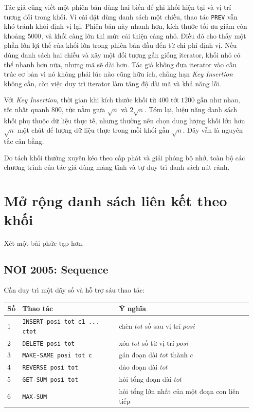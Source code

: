 \documentclass[11pt]{article}
\begin{document}
Tác giả cũng viết một phiên bản dùng hai biến để ghi khối hiện tại và vị trí
tương đối trong khối. Vì cài đặt dùng danh sách một chiều, thao tác
\texttt{PREV} vẫn khó tránh khỏi định vị lại. Phiên bản này nhanh hơn, kích
thước tối ưu giảm còn khoảng \(5000\), và khối càng lớn thì mức cải thiện càng
nhỏ. Điều đó cho thấy một phần lớn lợi thế của khối lớn trong phiên bản đầu
đến từ chi phí định vị. Nếu dùng danh sách hai chiều và xây một đối tượng gần
giống iterator, khối nhỏ có thể nhanh hơn nữa, nhưng mã sẽ dài hơn. Tác giả
không đưa iterator vào cấu trúc cơ bản vì nó không phải lúc nào cũng hữu ích,
chẳng hạn \textit{Key Insertion} không cần, còn việc duy trì iterator làm tăng
độ dài mã và khả năng lỗi.

Với \textit{Key Insertion}, thời gian khi kích thước khối từ \(400\) tới
\(1200\) gần như nhau, tốt nhất quanh \(800\), tức nằm giữa \(\sqrt n\) và
\(2\sqrt n\). Tóm lại, hiệu năng danh sách khối phụ thuộc dữ liệu thực tế,
nhưng thường nên chọn dung lượng khối lớn hơn \(\sqrt n\) một chút để lượng
dữ liệu thực trong mỗi khối gần \(\sqrt n\). Đây vẫn là nguyên tắc cân bằng.

Do tách khối thường xuyên kéo theo cấp phát và giải phóng bộ nhớ, toàn bộ các
chương trình của tác giả dùng mảng tĩnh và tự duy trì danh sách nút rảnh.

\section{Mở rộng danh sách liên kết theo khối}

Xét một bài phức tạp hơn.

\subsection{NOI 2005: Sequence}

Cần duy trì một dãy số và hỗ trợ sáu thao tác:
\begin{center}
\begin{tabular}{lll}
\textbf{Số} & \textbf{Thao tác} & \textbf{Ý nghĩa}\\
\hline
1 & \texttt{INSERT posi tot c1 ... ctot} & chèn \(tot\) số sau vị trí \(posi\)\\
2 & \texttt{DELETE posi tot} & xóa \(tot\) số từ vị trí \(posi\)\\
3 & \texttt{MAKE-SAME posi tot c} & gán đoạn dài \(tot\) thành \(c\)\\
4 & \texttt{REVERSE posi tot} & đảo đoạn dài \(tot\)\\
5 & \texttt{GET-SUM posi tot} & hỏi tổng đoạn dài \(tot\)\\
6 & \texttt{MAX-SUM} & hỏi tổng lớn nhất của một đoạn con liên tiếp
\end{tabular}
\end{center}
\end{document}
